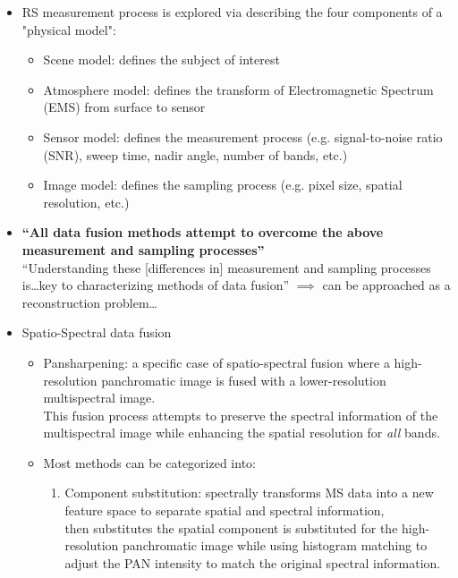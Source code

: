 \begin{itemize}
\begin{itemize}
\begin{itemize}
                \end{itemize}
            \item RS measurement process is explored via describing the four components of a "physical model":
                \begin{itemize}
                    \item Scene model: defines the subject of interest
                    \item Atmosphere model: defines the transform of Electromagnetic Spectrum (EMS) from surface to sensor
                    \item Sensor model: defines the measurement process (e.g. signal-to-noise ratio (SNR), sweep time, nadir angle, number of bands, etc.)
                    \item Image model: defines the sampling process (e.g. pixel size, spatial resolution, etc.)
                \end{itemize}
            \item \textbf{``All data fusion methods attempt to overcome the above measurement and sampling processes''} \\ 
            ``Understanding these [differences in] measurement and sampling processes is\dots key to characterizing methods of data fusion'' 
            $\implies$ can be approached as a reconstruction problem\dots\\
            \item Spatio-Spectral data fusion
                \begin{itemize}
                    \item Pansharpening: a specific case of spatio-spectral fusion where a high-resolution panchromatic image is fused with a lower-resolution multispectral image. \\
                    This fusion process attempts to preserve the spectral information of the multispectral image while enhancing the spatial resolution for \textit{all} bands. 
                    \item Most methods can be categorized into: 
                        \begin{enumerate}
                            \item Component substitution: spectrally transforms MS data into a new feature space to separate spatial and spectral information, \\ 
                            then substitutes the spatial component is substituted for the high-resolution panchromatic image while using histogram matching to adjust the PAN intensity to match the original spectral information.

\end{enumerate}
\end{itemize}
\end{itemize}
\end{itemize}
